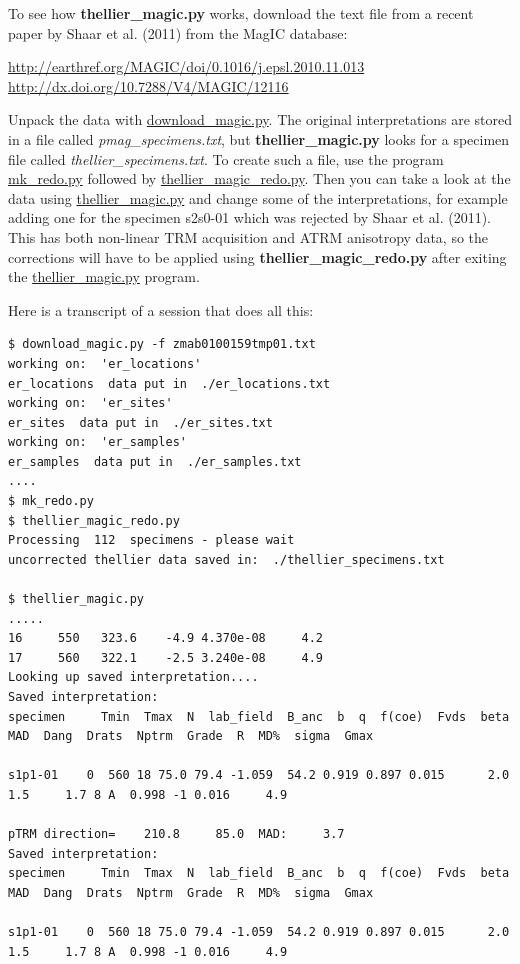 \documentclass[11pt]{book}
\begin{document}
{{{To see how {\bf thellier\_magic.py}  works, download the text file from a recent paper by Shaar et al. (2011) from the MagIC database:

\nocite{shaar11}
\url{http://earthref.org/MAGIC/doi/0.1016/j.epsl.2010.11.013}
\url{http://dx.doi.org/10.7288/V4/MAGIC/12116}

Unpack the data with \href{#download_magic.py}{download\_magic.py}.   The original interpretations are stored in a file called {\it pmag\_specimens.txt}, but {\bf thellier\_magic.py} looks for a specimen file called {\it thellier\_specimens.txt}.  To create such a file, use the program \href{#mk_redo.py}{mk\_redo.py} followed by \href{#thellier_magic_redo.py}{thellier\_magic\_redo.py}.  Then you can take a look  at the data using \href{#thellier_magic.py}{thellier\_magic.py} and change some of the interpretations, for example adding one for the specimen s2s0-01 which was rejected by Shaar et al. (2011).   This has both non-linear TRM acquisition and ATRM anisotropy data, so the corrections will have to be applied using {\bf thellier\_magic\_redo.py} after exiting the \href{thellier_magic.py}{thellier\_magic.py} program.

Here is a transcript of a session that does all this:

\begin{verbatim}
$ download_magic.py -f zmab0100159tmp01.txt
working on:  'er_locations'
er_locations  data put in  ./er_locations.txt
working on:  'er_sites'
er_sites  data put in  ./er_sites.txt
working on:  'er_samples'
er_samples  data put in  ./er_samples.txt
....
$ mk_redo.py
$ thellier_magic_redo.py
Processing  112  specimens - please wait
uncorrected thellier data saved in:  ./thellier_specimens.txt

$ thellier_magic.py
.....
16     550   323.6    -4.9 4.370e-08     4.2
17     560   322.1    -2.5 3.240e-08     4.9
Looking up saved interpretation....
Saved interpretation:
specimen     Tmin  Tmax  N  lab_field  B_anc  b  q  f(coe)  Fvds  beta  MAD  Dang  Drats  Nptrm  Grade  R  MD%  sigma  Gmax

s1p1-01    0  560 18 75.0 79.4 -1.059  54.2 0.919 0.897 0.015      2.0     1.5     1.7 8 A  0.998 -1 0.016     4.9

pTRM direction=    210.8     85.0  MAD:     3.7
Saved interpretation:
specimen     Tmin  Tmax  N  lab_field  B_anc  b  q  f(coe)  Fvds  beta  MAD  Dang  Drats  Nptrm  Grade  R  MD%  sigma  Gmax

s1p1-01    0  560 18 75.0 79.4 -1.059  54.2 0.919 0.897 0.015      2.0     1.5     1.7 8 A  0.998 -1 0.016     4.9


\end{verbatim}}}}
\end{document}
